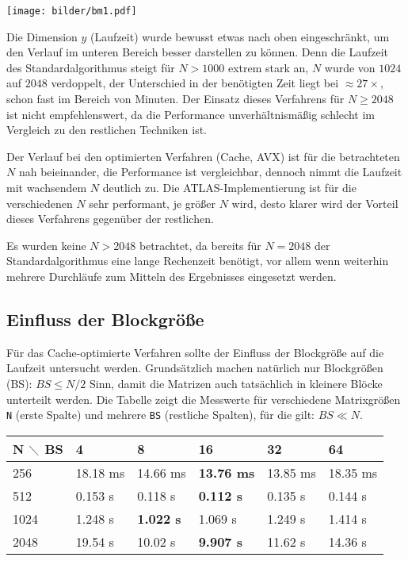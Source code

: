 \documentclass[a4paper,11pt]{scrartcl}
\begin{document}
\begin{center}
\texttt{[image: bilder/bm1.pdf]}
\end{center}

Die Dimension $y$ (Laufzeit) wurde bewusst etwas nach oben eingeschränkt, um den Verlauf
im unteren Bereich besser darstellen zu können. Denn die Laufzeit des Standardalgorithmus 
steigt für $N>1000$ extrem stark an, $N$ wurde von $1024$ auf $2048$ verdoppelt, 
der Unterschied in der benötigten Zeit liegt bei $\approx 27\times$, schon fast im Bereich von
Minuten. Der Einsatz dieses
Verfahrens für $N \geq 2048 $ ist nicht empfehlenswert, da die Performance un­ver­hält­nis­mä­ßig schlecht im Vergleich zu den restlichen Techniken ist.\newline

Der Verlauf bei den optimierten Verfahren (Cache, AVX) ist für die betrachteten $N$ nah beieinander,
die Performance ist vergleichbar, dennoch nimmt die Laufzeit mit wachsendem $N$ deutlich zu.
Die ATLAS-Implementierung ist für die verschiedenen $N$ sehr performant, je größer $N$ wird, desto
klarer wird der Vorteil dieses Verfahrens gegenüber der restlichen.\newline

Es wurden keine $N>2048$ betrachtet, da bereits für $N=2048$
der Standardalgorithmus eine lange Rechenzeit benötigt, vor allem wenn weiterhin mehrere
Durchläufe zum Mitteln des Ergebnisses eingesetzt werden.


\subsection{Einfluss der Blockgröße}\label{chp:BS}
Für das Cache-optimierte Verfahren sollte der Einfluss der Blockgröße auf die Laufzeit
untersucht werden. Grundsätzlich machen natürlich nur Blockgrößen (BS): $BS \leq N/2$
Sinn, damit die Matrizen auch tatsächlich in kleinere Blöcke unterteilt werden.
Die Tabelle zeigt die Messwerte für verschiedene Matrixgrößen \texttt{N} (erste Spalte)
und mehrere \texttt{BS} (restliche Spalten), für die gilt: $BS \ll N$.

\begin{center}
\begin{tabular}{| l | l | l | l | l | l |}
\hline
N $\diagdown$ BS & 4 & 8 & 16 & 32 & 64  \\ \hline

256 & 18.18 ms & 14.66 ms & \textbf{13.76 ms} & 13.85 ms & 18.35 ms  \\ \hline
512 & 0.153 s & 0.118 s & \textbf{0.112 s} & 0.135 s & 0.144 s  \\ \hline
1024 & 1.248 s & \textbf{1.022 s} & 1.069 s & 1.249 s & 1.414 s  \\ \hline
2048 & 19.54 s & 10.02 s & \textbf{9.907 s} & 11.62 s & 14.36 s  \\ \hline
\end{tabular}
\end{center}
\end{document}
